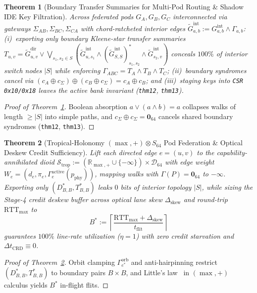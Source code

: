 \documentclass[11pt,letterpaper]{article}
\theoremstyle{spectralthm}
\newtheorem{theorem}{Theorem}[section]
\begin{document}
\begin{theorem}[Boundary Transfer Summaries for Multi-Pod Routing \& Shadow IDE Key Filtration]
\label{thm:pod_gluing}
Across federated pods $G_A, G_B, G_C$ interconnected via gateways $\Sigma_{AB}, \Sigma_{BC}, \Sigma_{CA}$ with chord-ratcheted interior edges $\tilde{G}_{a,b}^{\mathrm{int}} := G_{a,b}^{\mathrm{int}} \wedge \Gamma_{a,b}$: (i)~exporting only boundary Kleene-star transfer summaries $T_{u,v} = \tilde{G}_{u,v}^{\mathrm{dir}} \vee \bigvee_{s_1, s_2 \in S} (\tilde{G}_{u,s_1}^{\mathrm{int}} \wedge (\tilde{G}_{S,S}^{\mathrm{int}})_{s_1,s_2}^* \wedge \tilde{G}_{s_2,v}^{\mathrm{int}})$ conceals $100\%$ of interior switch nodes $|S|$ while enforcing $\Gamma_{ABC} = T_A \wedge T_B \wedge T_C$; (ii)~boundary syndromes cancel via $(c_A \oplus c_\Sigma) \oplus (c_B \oplus c_\Sigma) = c_A \oplus c_B$; and (iii)~staging keys into \texttt{CSR 0x10/0x18} leaves the active bank invariant (\texttt{thm12}, \texttt{thm13}).
\end{theorem}
\begin{proof}[Proof of Theorem~\ref{thm:pod_gluing}]
Boolean absorption $a \vee (a \wedge b) = a$ collapses walks of length $\ge |S|$ into simple paths, and $c_\Sigma \oplus c_\Sigma = \mathbf{0}_{64}$ cancels shared boundary syndromes (\texttt{thm12}, \texttt{thm13}).
\end{proof}

\begin{theorem}[Tropical-Holonomy $(\max,+) \otimes S_{64}$ Pod Federation \& Optical Deskew Credit Sufficiency]
\label{thm:tropical_pod}
Lift each directed edge $e = (u,v)$ to the capability-annihilated dioid $\mathcal{S}_{\mathrm{trop}} := (\mathbb{R}_{\max,+} \cup \{-\infty\}) \times \mathcal{D}_{64}$ with edge weight $W_e = (d_e, \pi_e, \Gamma_e^{\mathrm{active}}(p_{\mathrm{phy}}))$, mapping walks with $\Gamma(P) = \mathbf{0}_{64}$ to $-\infty$. Exporting only $(D_{B,B}^*, T_{B,B}^*)$ leaks $0$ bits of interior topology $|S|$, while sizing the Stage-4 credit deskew buffer across optical lane skew $\Delta_{\mathrm{skew}}$ and round-trip $\mathrm{RTT}_{\max}$ to
\begin{equation}
\label{eq:tropical_buffer}
B^* := \left\lceil \frac{\mathrm{RTT}_{\max} + \Delta_{\mathrm{skew}}}{t_{\mathrm{flit}}} \right\rceil
\end{equation}
guarantees $100\%$ line-rate utilization ($\eta = 1$) with zero credit starvation and $\Delta t_{\mathrm{CRD}} \equiv 0$.
\end{theorem}
\begin{proof}[Proof of Theorem~\ref{thm:tropical_pod}]
Orbit clamping $\Gamma_{e^*}^{\mathrm{orb}}$ and anti-hairpinning restrict $(D_{B,B}^*, T_{B,B}^*)$ to boundary pairs $B \times B$, and Little's law~\cite{little1961proof} in $(\max,+)$ calculus yields $B^*$ in-flight flits.
\end{proof}
\end{document}
